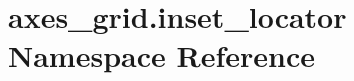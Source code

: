\hypertarget{namespaceaxes__grid_1_1inset__locator}{}\section{axes\+\_\+grid.\+inset\+\_\+locator Namespace Reference}
\label{namespaceaxes__grid_1_1inset__locator}
